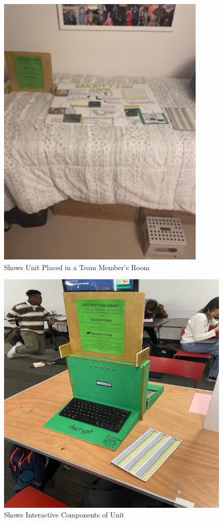 \documentclass[conference]{IEEEtran}
\begin{document}
 \begin{figure}[H]
   \centering
   \includegraphics[width=.9\textwidth]{Figures/Log/PhotoLog3.png}
   \caption{Shows Unit Placed in a Team Member's Room}
 \end{figure}
 \begin{figure}[H]
   \centering
   \includegraphics[width=.9\textwidth]{Figures/Log/PhotoLog4.png}
   \caption{Shows Interactive Components of Unit}
 \end{figure}
\end{document}
